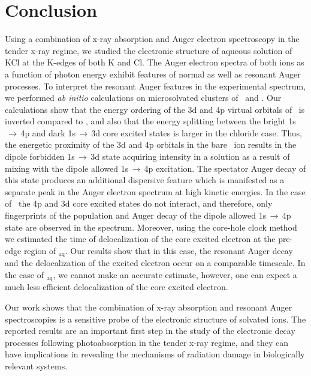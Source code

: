 \section{Conclusion}\label{sec:concl}

Using a combination of x-ray absorption and Auger electron spectroscopy in the tender x-ray regime, we studied the electronic structure of aqueous solution of KCl at the K-edges of both K and Cl. The Auger electron spectra of both ions as a function of photon energy exhibit features of normal as well as resonant Auger processes. To interpret the resonant Auger features in the experimental spectrum, we performed {\it ab initio} calculations on microsolvated clusters of \ki~and \cli. Our calculations show that the energy ordering of the 3d and 4p virtual orbitals of \cli~is inverted compared to \ki, and also that the energy splitting between the bright 1s$\,\rightarrow\,$4p and dark 1s$\,\rightarrow\,$3d core excited states is larger in the chloride case. Thus, the energetic proximity of the 3d and 4p orbitals in the bare \ki~ion results in the dipole forbidden 1s$\,\rightarrow\,$3d state acquiring intensity in a solution as a result of mixing with the dipole allowed 1s$\,\rightarrow\,$4p excitation. The spectator Auger decay of this state produces an additional dispersive feature which is manifested as a separate peak in the Auger electron spectrum at high kinetic energies. In the case of \cli~the 4p and 3d core excited states do not interact, and therefore, only fingerprints of the population and Auger decay of the dipole allowed 1s$\,\rightarrow\,$4p state are observed in the spectrum. Moreover, using the core-hole clock method we estimated the time of delocalization of the core excited electron at the pre-edge region of \cli$_{\text{aq}}$. Our results show that in this case, the resonant Auger decay and the delocalization of the excited electron occur on a comparable timescale. In the case of \ki$_{\text{aq}}$, we cannot make an accurate estimate, however, one can expect a much less efficient delocalization of the core excited electron.


Our work shows that the combination of x-ray absorption and resonant Auger spectroscopies is a sensitive probe of the electronic structure of solvated ions. The reported results are an important first step in the study of the electronic decay processes following photoabsorption in the tender x-ray regime, and they can have implications in revealing the mechanisms of radiation damage in biologically relevant systems.